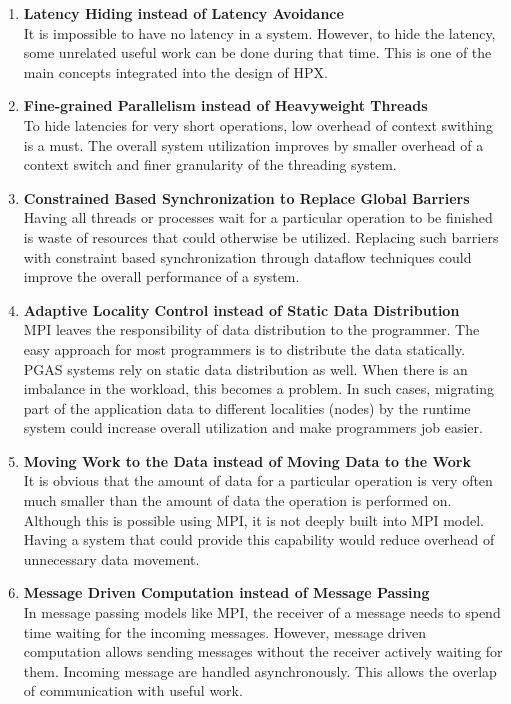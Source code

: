 \begin{enumerate}
\item \textbf{Latency Hiding instead of Latency Avoidance}\\
  It is impossible to have no latency in a system. However, to hide the latency, some unrelated useful work can be done during that time. This is one of the main concepts integrated into the design of HPX.
  
\item \textbf{Fine-grained Parallelism instead of Heavyweight Threads}\\
  To hide latencies for very short operations, low overhead of context swithing is a must. The overall system utilization improves by smaller overhead of a context switch and finer granularity of the threading system.
  
\item \textbf{Constrained Based Synchronization to Replace Global Barriers}\\
  Having all threads or processes wait for a particular operation to be finished is waste of resources that could otherwise be utilized. Replacing such barriers with constraint based synchronization through dataflow techniques could improve the overall performance of a system.
  
\item \textbf{Adaptive Locality Control instead of Static Data Distribution}\\
  MPI leaves the responsibility of data distribution to the programmer. The easy approach for most programmers is to distribute the data statically. PGAS systems rely on static data distribution as well. When there is an imbalance in the workload, this becomes a problem. In such cases, migrating part of the application data to different localities (nodes) by the runtime system could increase overall utilization and make programmers job easier.
  
\item \textbf{Moving Work to the Data instead of Moving Data to the Work}\\
  It is obvious that the amount of data for a particular operation is very often much smaller than the amount of data the operation is performed on. Although this is possible using MPI, it is not deeply built into MPI model. Having a system that could provide this capability would reduce overhead of unnecessary data movement.
  
\item \textbf{Message Driven Computation instead of Message Passing}\\
  In message passing models like MPI, the receiver of a message needs to spend time waiting for the incoming messages. However, message driven computation allows sending messages without the receiver actively waiting for them. Incoming message are handled asynchronously. This allows the overlap of communication with useful work.
\end{enumerate}

